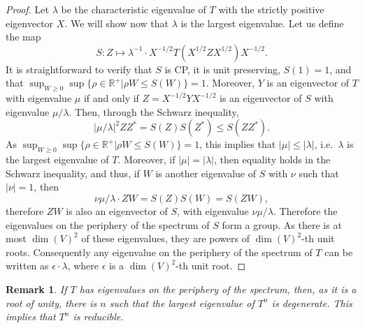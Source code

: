 \documentclass{article}
\newtheorem{remark}{Remark}
\begin{document}
\begin{proof}
  Let $\lambda$ be the characteristic eigenvalue of $T$ with the strictly positive eigenvector $X$. We will show now that $\lambda$ is the largest eigenvalue. Let us define the map 
  \begin{equation*}
    S: Z \mapsto \lambda^{-1} \cdot X^{-1/2}T(X^{1/2} Z X^{1/2}) X^{-1/2}.
  \end{equation*}
  It is straightforward to verify that $S$ is CP, it is unit preserving, $S(1)=1$, and that $\sup_{W\geq 0}\sup\{\rho\in \mathbb{R}^+ | \rho W \leq S (W)\} = 1$. Moreover, $Y$ is an eigenvector of $T$ with eigenvalue $\mu$ if and only if $Z = X^{-1/2} Y X^{-1/2}$ is an eigenvector of $S$ with eigenvalue $\mu/\lambda$. Then, through the Schwarz inequality,
  \begin{equation*}
    |\mu/\lambda|^2 Z Z^* = S(Z) S(Z^*) \leq S(ZZ^*).
  \end{equation*}
  As $\sup_{W\geq 0}\sup\{\rho\in \mathbb{R}^+ | \rho W \leq S (W)\} = 1$, this implies that $|\mu|\leq |\lambda|$, i.e.\ $\lambda$ is the largest eigenvalue of $T$. Moreover, if $|\mu| = |\lambda|$, then equality holds in the Schwarz inequality, and thus, if $W$ is another eigenvalue of $S$ with $\nu$ such that $|\nu|=1$, then 
  \begin{equation*}
    \nu \mu/ \lambda \cdot ZW = S(Z) S(W)  =  S(ZW),
  \end{equation*}
  therefore $ZW$ is also an eigenvector of $S$, with eigenvalue $\nu\mu/\lambda$. Therefore the eigenvalues on the periphery of the spectrum of $S$ form a group. As there is at most $\dim(V)^2$ of these eigenvalues, they are powers of $\dim(V)^2$-th unit roots. Consequently any eigenvalue on the periphery of the spectrum of $T$ can be written as $\epsilon\cdot \lambda$, where $\epsilon$ is a $\dim(V)^2$-th unit root.
\end{proof}





\begin{remark}
  If $T$ has eigenvalues on the periphery of the spectrum, then, as it is a root of unity, there is $n$ such that the largest eigenvalue of $T^n$ is degenerate. This implies that $T^n$ is reducible. 
\end{remark}
\end{document}
